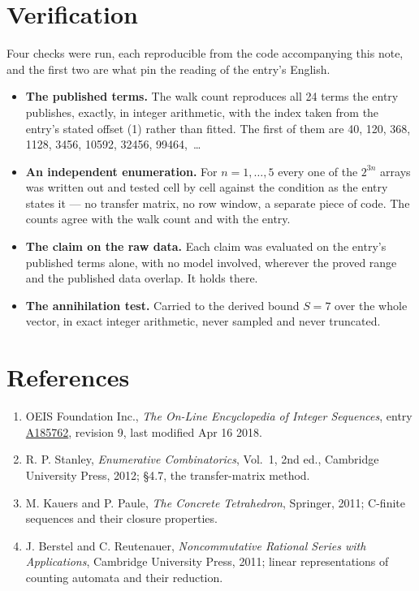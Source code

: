 \documentclass[11pt]{article}
\theoremstyle{definition}
\begin{document}
\section{Verification}

Four checks were run, each reproducible from the code accompanying this note, and the first two are what pin the reading of the entry's English.

\begin{itemize}

\item {\bfseries The published terms.} The walk count reproduces all 24 terms the entry publishes, exactly, in integer arithmetic, with the index taken from the entry's stated offset (1) rather than fitted. The first of them are 40, 120, 368, 1128, 3456, 10592, 32456, 99464,~\dots

\item {\bfseries An independent enumeration.} For $n = 1,\dots,5$ every one of the $2^{3n}$ arrays was written out and tested cell by cell against the condition as the entry states it --- no transfer matrix, no row window, a separate piece of code. The counts agree with the walk count and with the entry.

\item {\bfseries The claim on the raw data.} Each claim was evaluated on the entry's published terms alone, with no model involved, wherever the proved range and the published data overlap. It holds there.

\item {\bfseries The annihilation test.} Carried to the derived bound $S = 7$ over the whole vector, in exact integer arithmetic, never sampled and never truncated.

\end{itemize}

\section{References}

\begin{enumerate}

\item OEIS Foundation Inc., \emph{The On-Line Encyclopedia of Integer Sequences}, entry \href{https://oeis.org/A185762}{A185762}, revision 9, last modified Apr 16 2018.

\item R. P. Stanley, \emph{Enumerative Combinatorics}, Vol.~1, 2nd ed., Cambridge University Press, 2012; \S4.7, the transfer-matrix method.

\item M. Kauers and P. Paule, \emph{The Concrete Tetrahedron}, Springer, 2011; C-finite sequences and their closure properties.

\item J. Berstel and C. Reutenauer, \emph{Noncommutative Rational Series with Applications}, Cambridge University Press, 2011; linear representations of counting automata and their reduction.

\end{enumerate}
\end{document}
